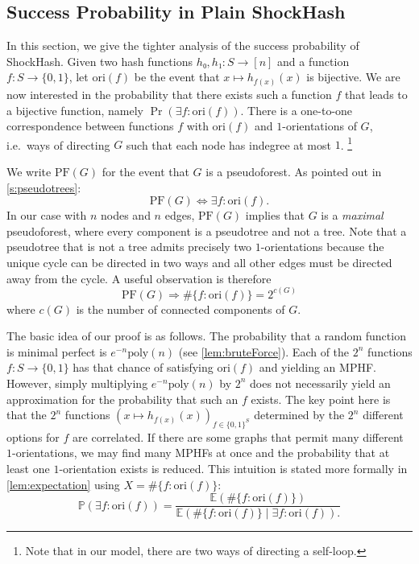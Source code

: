 \documentclass[a4paper,USenglish,cleveref]{lipics-v2021}
\begin{document}
\subsection{Success Probability in Plain ShockHash}\label{ss:successProbability}
In this section, we give the tighter analysis of the success probability of ShockHash.
\def\orient{\mathrm{ori}}
\def\PF{\mathrm{PF}}
Given two hash functions $h₀,h₁: S → [n]$ and a function $f: S → \{0,1\}$, let $\orient(f)$ be the event that $x ↦ h_{f(x)}(x)$ is bijective.
We are now interested in the probability that there exists such a function $f$ that leads to a bijective function, namely $\Pr(\exists f : \orient(f))$.
There is a one-to-one correspondence between functions $f$ with $\orient(f)$ and $1$-orientations of $G$, i.e.\ ways of directing $G$ such that each node has indegree at most $1$.%
\footnote{Note that in our model, there are two ways of directing a self-loop.}

We write $\PF(G)$ for the event that $G$ is a pseudoforest.
As pointed out in \cref{s:pseudotrees}:
\begin{equation}
  \PF(G) ⇔ ∃f: \orient(f).
  \label{eq:pseudoforests-orientable}
\end{equation}
In our case with $n$ nodes and $n$ edges, $\PF(G)$ implies that $G$ is a \emph{maximal} pseudoforest, where every component is a pseudotree and not a tree.
Note that a pseudotree that is not a tree admits precisely two $1$-orientations because the unique cycle can be directed in two ways and all other edges must be directed away from the cycle.
A useful observation is therefore
\begin{equation}
  \PF(G) ⇒ \# \{f : \orient(f) \} = 2^{c(G)}
  \label{eq:orientations-cycles}
\end{equation}
where $c(G)$ is the number of connected components of $G$.

The basic idea of our proof is as follows.
The probability that a random function is minimal perfect is $e^{-n}\textrm{poly}(n)$ (see \cref{lem:bruteForce}).
Each of the $2^n$ functions $f: S → \{0,1\}$ has that chance of satisfying $\orient(f)$ and yielding an MPHF.
However, simply multiplying $e^{-n}\textrm{poly}(n)$ by $2^n$ does not necessarily yield an approximation for the probability that such an $f$ exists.
The key point here is that the $2^n$ functions $(x \mapsto h_{f(x)}(x))_{f \in \{0,1\}^S}$ determined by the $2^n$ different options for $f$ are correlated.
If there are some graphs that permit many different $1$-orientations, we may find many MPHFs at once and the probability that at least one $1$-orientation exists is reduced.
This intuition is stated more formally in \cref{lem:expectation} using $X=\#\{f : \orient(f)\}$:
\[
  ℙ(∃f: \orient(f)) = \frac{𝔼(\#\{f : \orient(f)\})}{𝔼(\#\{f : \orient(f)\} \mid ∃f: \orient(f)).}
\]
\end{document}
